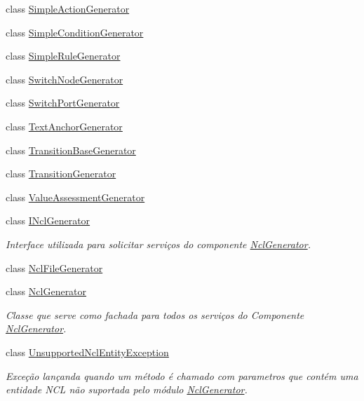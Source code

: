 \begin{DoxyCompactItemize}
\item 
class \hyperlink{classbr_1_1ufscar_1_1lince_1_1ncl_1_1generator_1_1SimpleActionGenerator}{SimpleActionGenerator}
\item 
class \hyperlink{classbr_1_1ufscar_1_1lince_1_1ncl_1_1generator_1_1SimpleConditionGenerator}{SimpleConditionGenerator}
\item 
class \hyperlink{classbr_1_1ufscar_1_1lince_1_1ncl_1_1generator_1_1SimpleRuleGenerator}{SimpleRuleGenerator}
\item 
class \hyperlink{classbr_1_1ufscar_1_1lince_1_1ncl_1_1generator_1_1SwitchNodeGenerator}{SwitchNodeGenerator}
\item 
class \hyperlink{classbr_1_1ufscar_1_1lince_1_1ncl_1_1generator_1_1SwitchPortGenerator}{SwitchPortGenerator}
\item 
class \hyperlink{classbr_1_1ufscar_1_1lince_1_1ncl_1_1generator_1_1TextAnchorGenerator}{TextAnchorGenerator}
\item 
class \hyperlink{classbr_1_1ufscar_1_1lince_1_1ncl_1_1generator_1_1TransitionBaseGenerator}{TransitionBaseGenerator}
\item 
class \hyperlink{classbr_1_1ufscar_1_1lince_1_1ncl_1_1generator_1_1TransitionGenerator}{TransitionGenerator}
\item 
class \hyperlink{classbr_1_1ufscar_1_1lince_1_1ncl_1_1generator_1_1ValueAssessmentGenerator}{ValueAssessmentGenerator}
\item 
class \hyperlink{classbr_1_1ufscar_1_1lince_1_1ncl_1_1generator_1_1INclGenerator}{INclGenerator}
\begin{DoxyCompactList}\small\item\em Interface utilizada para solicitar serviços do componente \hyperlink{classbr_1_1ufscar_1_1lince_1_1ncl_1_1generator_1_1NclGenerator}{NclGenerator}. \item\end{DoxyCompactList}\item 
class \hyperlink{classbr_1_1ufscar_1_1lince_1_1ncl_1_1generator_1_1NclFileGenerator}{NclFileGenerator}
\item 
class \hyperlink{classbr_1_1ufscar_1_1lince_1_1ncl_1_1generator_1_1NclGenerator}{NclGenerator}
\begin{DoxyCompactList}\small\item\em Classe que serve como fachada para todos os serviços do Componente \hyperlink{classbr_1_1ufscar_1_1lince_1_1ncl_1_1generator_1_1NclGenerator}{NclGenerator}. \item\end{DoxyCompactList}\item 
class \hyperlink{classbr_1_1ufscar_1_1lince_1_1ncl_1_1generator_1_1UnsupportedNclEntityException}{UnsupportedNclEntityException}
\begin{DoxyCompactList}\small\item\em Exceção lançanda quando um método é chamado com parametros que contém uma entidade NCL não suportada pelo módulo \hyperlink{classbr_1_1ufscar_1_1lince_1_1ncl_1_1generator_1_1NclGenerator}{NclGenerator}. \item\end{DoxyCompactList}\end{DoxyCompactItemize}
